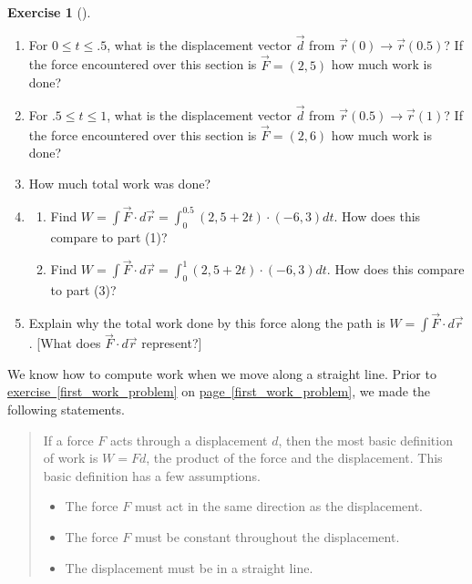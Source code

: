 \documentclass[10pt,]{book}
\theoremstyle{plain}
\theoremstyle{definition}
\theoremstyle{definition}
\theoremstyle{definition}
\theoremstyle{definition}
\newtheorem{exploration}[project]{Exercise}
\theoremstyle{definition}
\numberwithin{equation}{section}
\newcommand{\ds}{\displaystyle}
\begin{document}
\begin{exploration}[]\label{exploration-190}
\leavevmode%
\begin{enumerate}[font=\bfseries,label=(\alph*),ref=\alph*]
\item\label{task-464} For \(0\leq t\leq .5\), what is the displacement vector \(\vec{d}\) from \(\vec{r}(0) \rightarrow \vec{r}(0.5)\)? If the force encountered over this section is \(\vec F = (2,5)\) how much work is done?%
\item\label{task-465} For \(.5\leq t\leq 1\), what is the displacement vector \(\vec{d}\) from \(\vec{r}(0.5) \rightarrow \vec{r}(1)\)? If the force encountered over this section is \(\vec F = (2,6)\) how much work is done?%
\item\label{task-466} How much total work was done?%
\item\label{task-467} \begin{enumerate}[font=\bfseries,label=(\roman*),ref=\theenumi.\roman*]
\item\label{task-468} Find \(\ds W=\int \vec F\cdot d\vec r = \int_0^{0.5} (2,5+2t)\cdot (-6,3)dt.\) How does this compare to part (1)?%
\item\label{task-469} Find \(\ds W=\int \vec F\cdot d\vec r = \int_0^1 (2,5+2t)\cdot (-6,3)dt.\) How does this compare to part (3)?%
\end{enumerate}
\item\label{task-470} Explain why the total work done by this force along the path is \(\ds W=\int \vec F\cdot d\vec r\). [What does \(\vec{F} \cdot d\vec{r}\) represent?]%
\end{enumerate}
\end{exploration}
We know how to compute work when we move along a straight line. Prior to \hyperref[first_work_problem]{exercise~\ref{first_work_problem}} on \hyperref[first_work_problem]{page~\ref{first_work_problem}}, we made the following statements.%
\begin{quote}\hypertarget{blockquote-5}{}
If a force \(F\) acts through a displacement \(d\), then the most basic definition of work is \(W=Fd\), the product of the force and the displacement.  This basic definition has a few assumptions. \leavevmode%
\begin{itemize}[label=\textbullet]
\item{}The force \(F\) must act in the same direction as the displacement.%
\item{}The force \(F\) must be constant throughout the  displacement.%
\item{}The displacement must be in a straight line.%
\end{itemize}
\end{quote}
\end{document}
